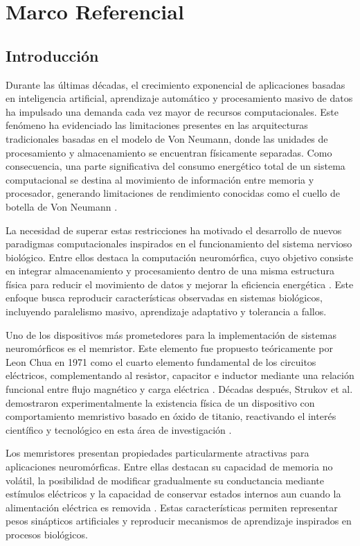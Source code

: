 \chapter{Marco Referencial}

\section{Introducción}

Durante las últimas décadas, el crecimiento exponencial de aplicaciones basadas en inteligencia artificial, aprendizaje automático y procesamiento masivo de datos ha impulsado una demanda cada vez mayor de recursos computacionales. Este fenómeno ha evidenciado las limitaciones presentes en las arquitecturas tradicionales basadas en el modelo de Von Neumann, donde las unidades de procesamiento y almacenamiento se encuentran físicamente separadas. Como consecuencia, una parte significativa del consumo energético total de un sistema computacional se destina al movimiento de información entre memoria y procesador, generando limitaciones de rendimiento conocidas como el cuello de botella de Von Neumann \cite{9,15}.

La necesidad de superar estas restricciones ha motivado el desarrollo de nuevos paradigmas computacionales inspirados en el funcionamiento del sistema nervioso biológico. Entre ellos destaca la computación neuromórfica, cuyo objetivo consiste en integrar almacenamiento y procesamiento dentro de una misma estructura física para reducir el movimiento de datos y mejorar la eficiencia energética \cite{2,15}. Este enfoque busca reproducir características observadas en sistemas biológicos, incluyendo paralelismo masivo, aprendizaje adaptativo y tolerancia a fallos.

Uno de los dispositivos más prometedores para la implementación de sistemas neuromórficos es el memristor. Este elemento fue propuesto teóricamente por Leon Chua en 1971 como el cuarto elemento fundamental de los circuitos eléctricos, complementando al resistor, capacitor e inductor mediante una relación funcional entre flujo magnético y carga eléctrica \cite{17}. Décadas después, Strukov et al. demostraron experimentalmente la existencia física de un dispositivo con comportamiento memristivo basado en óxido de titanio, reactivando el interés científico y tecnológico en esta área de investigación \cite{26}.

Los memristores presentan propiedades particularmente atractivas para aplicaciones neuromórficas. Entre ellas destacan su capacidad de memoria no volátil, la posibilidad de modificar gradualmente su conductancia mediante estímulos eléctricos y la capacidad de conservar estados internos aun cuando la alimentación eléctrica es removida \cite{26,2}. Estas características permiten representar pesos sinápticos artificiales y reproducir mecanismos de aprendizaje inspirados en procesos biológicos.

